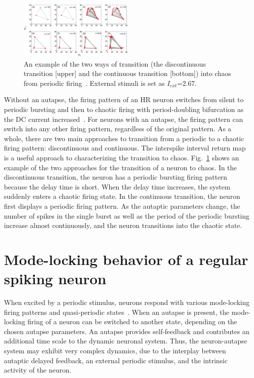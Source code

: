 \documentclass[twocolumn,showpacs,preprintnumbers,amsmath,amssymb,pre,superscriptaddress]{revtex4-1}
\begin{document}
\begin{CJK}{UTF8}{gbsn}
\begin{figure}
\begin{center}
\includegraphics[width=0.5\textwidth]{fig5_ways_trasition_chaos.eps}
\caption{An example of the two ways of transition (the discontinuous transition [upper] and the continuous transition [bottom]) into chaos from periodic firing~\cite{wht2014a}.
External stimuli is set as $I_{ext}$=2.67.}
\label{cnsns_returnmap1}
\end{center}
\end{figure} 

Without an autapse, the firing pattern of an HR neuron switches from silent to periodic bursting and then to chaotic firing with period-doubling bifurcation as the DC current increased~\cite{wangxj,gnzalez,innocenti,innocenti2009}. For neurons with an autapse, the firing pattern can switch into any other firing pattern, regardless of the original pattern. As a whole, there are two main approaches to transition from a periodic to a chaotic firing pattern: discontinuous and continuous. The interspike interval return map is a useful approach to characterizing the transition to chaos. Fig.~\ref{cnsns_returnmap1} shows an example of the two approaches for the transition of a neuron to chaos. In the discontinuous transition, the neuron has a periodic bursting firing pattern because the delay time is short. When the delay time increases, the system suddenly enters a chaotic firing state. In the continuous transition, the neuron first displays a periodic firing pattern. As the autaptic parameters change, the number of spikes in the single burst as well as the period of the periodic bursting increase almost continuously, and the neuron transitions into the chaotic state.




\section{Mode-locking behavior of a regular spiking neuron}
%

When excited by a periodic stimulus, neurons respond with various mode-locking firing patterns and quasi-periodic states~\cite{leesg,chey,wanght,fellous,wht_jtb}. When an autapse is present, the mode-locking firing of a neuron can be switched to another state, depending on the chosen autapse parameters. An autapse provides self-feedback and contributes an additional time scale to the dynamic neuronal system. Thus, the neuron-autapse system may exhibit very complex dynamics, due to the interplay between autaptic delayed feedback, an external periodic stimulus, and the intrinsic activity of the neuron.


\end{CJK}
\end{document}
